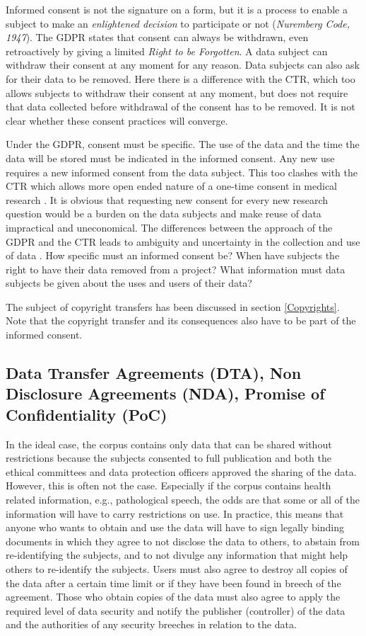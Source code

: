 \documentclass[10pt, a4paper]{article}
\begin{document}
Informed consent is not the signature on a form, but it is a process to enable a subject to make an {\em enlightened decision} to participate or not ({\em Nuremberg Code, 1947}). The GDPR states that consent can always be withdrawn, even retroactively by giving a limited {\em Right to be Forgotten}. A data subject can withdraw their consent at any moment for any reason. Data subjects can also ask for their data to be removed. Here there is a difference with the CTR, which too allows subjects to withdraw their consent at any moment, but does not require that data collected before withdrawal of the consent has to be removed. It is not clear whether these consent practices will converge. 

Under the GDPR, consent must be specific. The use of the data and the time the data will be stored must be indicated in the informed consent. Any new use requires a new informed consent from the data subject. This too clashes with the CTR which allows more open ended nature of a one-time consent in medical research \cite{dittrich2015esmod}. It is obvious that requesting new consent for every new research question would be a burden on the data subjects and make reuse of data impractical and uneconomical. The differences between the approach of the GDPR and the CTR leads to ambiguity and uncertainty in the collection and use of data \cite{chassang2017impact}. How specific must an informed consent be? When have subjects the right to have their data removed from a project? What information must data subjects be given about the uses and users of their data?

The subject of copyright transfers has been discussed in section \ref{Copyrights}. Note that the copyright transfer and its consequences also have to be part of the informed consent. 

\subsection{Data Transfer Agreements (DTA), Non Disclosure Agreements (NDA), Promise of Confidentiality (PoC)}

In the ideal case, the corpus contains only data that can be shared without restrictions because the subjects consented to full publication and both the ethical committees and data protection officers approved the sharing of the data. However, this is often not the case. Especially if the corpus contains health related information, e.g., pathological speech, the odds are that some or all of the information will have to carry restrictions on use. In practice, this means that anyone who wants to obtain and use the data will have to sign legally binding documents in which they agree to not disclose the data to others, to abstain from re-identifying the subjects, and to not divulge any information that might help others to re-identify the subjects. Users must also agree to destroy all copies of the data after a certain time limit or if they have been found in breech of the agreement. Those who obtain copies of the data must also agree to apply the required level of data security and notify the publisher (controller) of the data and the authorities of any security breeches in relation to the data.
\end{document}
